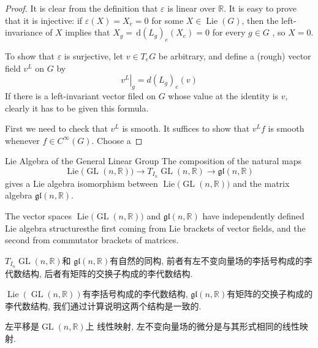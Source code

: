 \documentclass[../main.tex]{subfiles}
\begin{document}
\begin{proof}
    It is clear from the definition that \(   \varepsilon   \) is linear over \(  \mathbb{R}   \). It is easy to prove that it is injective: if \(   \varepsilon \left( X \right)= X_{e}= 0   \) for some \(  X \in \operatorname{Lie}\left( G \right)   \), then the left-invariance of \(  X  \) implies that \(  X_{g}= \,\mathrm{d} \left( L_{g} \right)_{e}\left( X_{e} \right)= 0    \) for every \(  g \in G  \) , so \(  X= 0  \).
    
    To show that \(   \varepsilon   \) is surjective, let \(  v\in T_{e}G  \) be arbitrary, and define a (rough) vector field \(  v^{L}  \) on \(  G  \) by \[
    \left. v^{L} \right|_{g}= d\left( L_{g} \right)_{e}\left( v \right)  
    \]If  there is a left-invariant vector filed on \(  G  \) whose value at the identity is \(  v  \), clearly it has to be given this formula.
    
    First we need to check that \(  v^{L}  \) is smooth. It suffices to show that \(  v^{L}f  \) is smooth whenever \(  f\in C^{\infty}\left( G \right)   \). Choose a    
\end{proof}

\begin{proposition}{Lie Algebra of the General Linear Group}{}
The composition of the natural maps
\[
\operatorname{Lie}\bigl(\operatorname{GL}(n,\mathbb{R})\bigr)\to T_{I_n}\operatorname{GL}(n,\mathbb{R})\to \mathfrak{gl}(n,\mathbb{R})
\]
gives a Lie algebra isomorphism between \(\operatorname{Lie}\bigl(\operatorname{GL}(n,\mathbb{R})\bigr)\) and the matrix algebra \(\mathfrak{gl}(n,\mathbb{R})\).
\end{proposition}

\begin{remark}
    The vector spaces \(\operatorname{Lie}\bigl(\operatorname{GL}(n,\mathbb{R})\bigr)\) and \(\mathfrak{gl}(n,\mathbb{R})\) have independently defined Lie algebra structures\textemdash the first coming from Lie brackets of vector fields, and the second from commutator brackets of matrices. 
\end{remark}

\begin{proofsketch}
    \( T_{I_{n}}\operatorname{GL} \left( n,\mathbb{R}  \right)   \)和 \(  \mathfrak{gl}\left( n,\mathbb{R}  \right)   \)有自然的同构, 前者有左不变向量场的李括号构成的李代数结构, 后者有矩阵的交换子构成的李代数结构.  

    \(  \operatorname{Lie}\left( \operatorname{GL} \left( n,\mathbb{R}  \right)  \right)   \)有李括号构成的李代数结构, \(  \mathfrak{gl}\left( n,\mathbb{R}  \right)   \)有矩阵的交换子构成的李代数结构, 我们通过计算说明这两个结构是一致的.  

    左平移是\(  \operatorname{GL} \left( n,\mathbb{R}  \right)   \)上 线性映射, 左不变向量场的微分是与其形式相同的线性映射.
\end{proofsketch}
\end{document}
